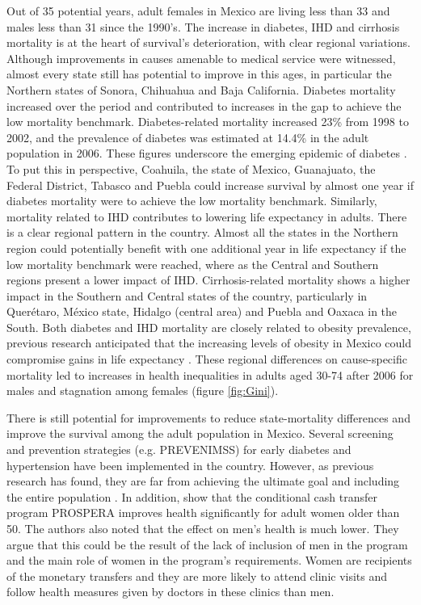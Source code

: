 \documentclass[11.5pt]{article}
\begin{document}
\begin{spacing}{1.5}
Out of 35 potential years, adult females in Mexico are living less than 33 and males less than 31 since the 1990's. The increase in  diabetes, IHD and cirrhosis mortality is at the heart of survival's deterioration, with clear regional variations. Although improvements in causes amenable to medical service were witnessed, almost every state still has potential to improve in this ages, in particular the Northern states of Sonora, Chihuahua and Baja California. Diabetes mortality increased over the period and contributed to increases in the gap to achieve the low mortality benchmark. Diabetes-related mortality increased 23\% from 1998 to 2002, and the prevalence of diabetes was estimated at 14.4\% in the adult population in 2006. These figures underscore the emerging epidemic of diabetes \citep{glassman2010confronting}. To put this in perspective, Coahuila, the state of Mexico, Guanajuato, the Federal District, Tabasco and Puebla could increase survival by almost one year if diabetes mortality were to achieve the low mortality benchmark. Similarly, mortality related to IHD contributes to lowering life expectancy in adults. There is a clear regional pattern in the country. Almost all the states in the Northern region could potentially benefit with one additional year in life expectancy if the low mortality benchmark were reached, where as the Central and Southern regions present a lower impact of IHD. Cirrhosis-related mortality shows a higher impact in the Southern and Central states of the country, particularly in Quer\'etaro, M\'exico state, Hidalgo (central area) and Puebla and Oaxaca in the South. Both diabetes and IHD mortality are closely related to obesity prevalence, previous research anticipated that the increasing levels of obesity in Mexico could compromise gains in life expectancy \citep{monteverde2010obesity}. These regional differences on cause-specific mortality led to increases in health inequalities in adults aged 30-74 after 2006 for males and stagnation among females (figure \ref{fig:Gini}). 


There is still potential for improvements to reduce state-mortality differences and improve the survival among the adult population in Mexico. Several screening and prevention strategies (e.g. PREVENIMSS) for early diabetes and hypertension have been implemented in the country. However, as previous research has found, they are far from achieving the ultimate goal and including the entire population \citep{castro2010potential}. In addition, \citet{behrman2013health} show that the conditional cash transfer program PROSPERA improves health significantly for adult women older than 50. The authors also noted that the effect on men's health is much lower. They argue that this could be the result of the lack of inclusion of men in the program and the main role of women in the program's requirements. Women are recipients of the monetary transfers and they are more likely to attend clinic visits and follow health measures given by doctors in these clinics than men.


\end{spacing}
\end{document}
